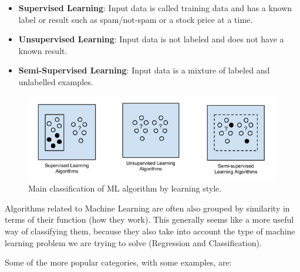 \begin{itemize}
	\item \textbf{Supervised Learning}: Input data is called training data and has a known label or result such as spam/not-spam or a stock price at a time.
	\item \textbf{Unsupervised Learning}: Input data is not labeled and does not have a known result.
	\item \textbf{Semi-Supervised Learning}: Input data is a mixture of labeled and unlabelled examples.
\end{itemize}

\begin{figure}[H]
	\centering
	\includegraphics[width=1\linewidth]{imagenes/ml-algos.png}
	\caption{Main classification of ML algorithm by learning style.}
	\label{ml-algos}
\end{figure}

Algorithms related to Machine Learning are often also grouped by similarity in terms of their function (how they work). This generally seems like a more useful way of classifying them, because they also take into account the type of machine learning problem we are trying to solve (Regression and Classification).

Some of the more popular categories, with some examples, are: 

